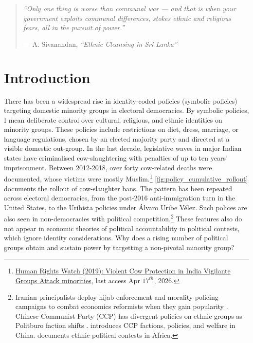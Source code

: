 \documentclass[11pt,twoside]{extarticle}
\begin{document}
\clearpage

\begin{quote}
\textit{``Only one thing is worse than communal war --- and that is when your government exploits communal differences, stokes ethnic and religious fears, all in the pursuit of power.''}

\hfill --- A. Sivanandan, \textit{``Ethnic Cleansing in Sri Lanka''}
\end{quote}

\section{Introduction}


There has been a widespread rise in identity-coded policies (symbolic policies) targeting domestic minority groups in electoral democracies. By symbolic policies, I mean deliberate control over cultural, religious, and ethnic identities on minority groups. These policies include restrictions on diet, dress, marriage, or language regulations, chosen by an elected majority party and directed at a visible domestic out-group. In the last decade, legislative waves in major Indian states have criminalised cow-slaughtering with penalties of up to ten years' imprisonment. Between 2012-2018, over forty cow-related deaths were documented, whose victims were mostly Muslim.\footnote{\href{https://www.hrw.org/report/2019/02/19/violent-cow-protection-india/vigilante-groups-attack-minorities}{Human Rights Watch (2019): Violent Cow Protection in India Vigilante Groups Attack minorities}, last access Apr $17^{th}$, 2026.} \autoref{fig:policy_cumulative_rollout} documents the rollout of cow-slaughter bans. The pattern has been repeated across electoral democracies, from the post-2016 anti-immigration turn in the United States, to the Uribista policies under Álvaro Uribe Vélez. Such polices are also seen in non-democracies with political competition.\footnote{Iranian principalists deploy hijab enforcement and morality-policing campaigns to combat economics reformists when they gain popularity \citep*{bajoghliIranReframedAnxieties2020}. Chinese Communist Party (CCP) has divergent policies on ethnic groups as Politburo faction shifts \citep*{leiboldEthnicPolicyChina2013}. \citet*{francoisFactionsNondemocraciesTheory2023} introduces CCP factions, policies, and welfare in China. \citet*{francoisHowPowerShared2015} documents ethnic-political contests in Africa.} These features also do not appear in economic theories of political accountability in political contests, which ignore identity considerations. Why does a rising number of political groups obtain and sustain power by targetting a non-pivotal minority group?
\end{document}
